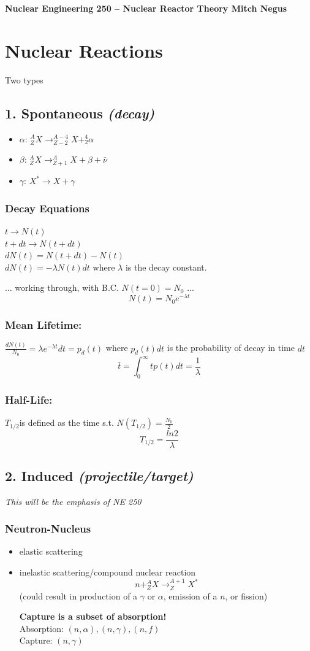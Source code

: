 \documentclass{report}
\newcommand{\h}[1]{\section*{#1}}
\newcommand{\hh}[1]{\subsection*{#1}}
\newcommand{\hhh}[1]{\subsubsection*{#1}}
\newcommand{\intzi}{\int_0^{\infty}}
\newcommand{\halflife}{T_{1/2}}
\begin{document}
\thispagestyle{empty}

{\bf {\large {Nuclear Engineering 250 -- Nuclear Reactor Theory \hfill Mitch Negus}}}


\h{Nuclear Reactions}

Two types


\hh{1. Spontaneous \textsl{(decay)}}

\begin{itemize}
    \item $\alpha$: $^A_ZX \rightarrow ^{A-4}_{Z-2}X + ^4_2\alpha$
    \item $\beta$: $^A_ZX \rightarrow ^A_{Z+1}X + \beta + \bar{\nu}$
    \item $\gamma$: $X^* \rightarrow X + \gamma$
\end{itemize}

\hhh{Decay Equations}
\begin{multicols}{2}
$ t \rightarrow N(t) $\\
$ t+dt \rightarrow N(t+dt) $\\
$dN(t) = N(t+dt) - N(t) $\\
$dN(t) = -\lambda N(t) dt$ where $\lambda$ is the decay constant.
\end{multicols}
... working through, with B.C. $N(t=0) = N_0$ ...
$$N(t) = N_0 e^{-\lambda t}$$

\hhh{Mean Lifetime:}
$\frac{dN(t)}{N_0} = \lambda e^{-\lambda t} dt = p_d(t)$ where $p_d(t) dt$ is the probability of decay in time $dt$
$$\bar{t} = \intzi t p(t) dt = \frac{1}{\lambda}$$

\hhh{Half-Life:}
$\halflife $is defined as the time s.t. $N(\halflife) = \frac{N_0}{2}$
$$\halflife = \frac{ln2}{\lambda}$$


\hh{2. Induced \textsl{(projectile/target)}}
\textsl{This will be the emphasis of NE 250}

\hhh{ Neutron-Nucleus}

\begin{itemize}
    \item elastic scattering
    \item inelastic scattering/compound nuclear reaction  
    $$n + ^A_ZX \rightarrow ^{A+1}_ZX^*$$
	(could result in production of a $\gamma$ or $\alpha$, emission of a $n$, or fission)
	
	\textbf{Capture is a subset of absorption!}\\
	Absorption: $(n,\alpha), (n,\gamma), (n,f)$\\
	Capture: $(n,\gamma)$
\end{itemize}
	
\end{document}
